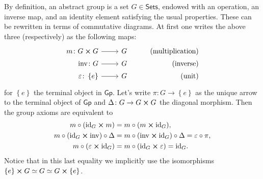 \begin{rem}[]
	By definition, an abstract group is a set $G \in \mathsf{Sets}$, endowed with an operation,
	an inverse map, and an identity element satisfying the usual properties.
	These can be rewritten in terms of commutative diagrams.
	At first one writes the above three (respectively) as the following maps:
	\begin{equation*}
			\begin{tikzcd}[row sep = 0ex
         ,/tikz/column 1/.append style={anchor=base east}
         ,/tikz/column 2/.append style={anchor=base west}
         ,/tikz/column 3/.append style={anchor=base east}]
			m\colon G \cross G \arrow[r, "", rightarrow] &
			G & \text{(multiplication)} \\
			\mathrm{inv}\colon G \arrow[r, "", rightarrow] &
			G & \text{(inverse)} \\
			\varepsilon \colon \left\{ e \right\} \arrow[r, "", rightarrow] &
			G & \text{(unit)} 
		\end{tikzcd}
	\end{equation*} 
	for $\left\{ e \right\}$ the terminal object in $\mathsf{Gp}$.
	Let's write $\pi\colon G \to \left\{ e \right\}$
	as the unique arrow to the terminal object of $\mathsf{Gp}$
	and $\Delta\colon G \to G \cross G$ the diagonal morphism.
	Then the group axioms are equivalent to
	\begin{align}\label{eq:GroupAxioms}
		m \circ (\mathrm{id}_{ G } \cross m) &= m \circ (m \cross \mathrm{id}_{ G }),\nonumber\\
		m \circ (\mathrm{id}_{ G } \cross \mathrm{inv}) \circ \Delta &=
		m \circ (\mathrm{inv} \cross \mathrm{id}_{ G }) \circ \Delta = \varepsilon \circ \pi,\\
		m \circ (\varepsilon \cross \mathrm{id}_{ G }) &=
		m \circ (\mathrm{id}_{ G } \cross \varepsilon) = \mathrm{id}_{ G }\nonumber
	.\end{align} 
	Notice that in this last equality we implicitly use the isomorphisms
	$\left\{ e \right\} \cross G \simeq G \simeq G \cross \left\{ e \right\}$.
\end{rem}


